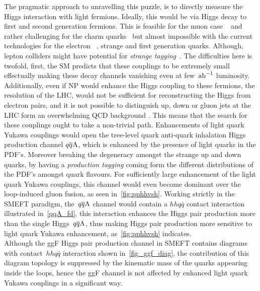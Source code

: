 The pragmatic approach to unravelling this puzzle, is to directly measure the Higgs interaction with light fermions. Ideally, this would be via Higgs decay to first and second generation fermions. This is feasible for the muon case ~\cite{ATLAS:2020fzp,CMS:2020xwi} and rather challenging for the charm quarks~\cite{ATLAS-CONF-2021-021,ATLAS:2022ers,CMS:2019hve} but almost impossible with the current technologies for the electron~ \cite{Khachatryan:2014aep}, strange and first generation quarks. Although, lepton colliders might have potential for \emph{strange tagging}~\cite{Nakai:2020kuu}. The difficulties here is twofold, first, the SM predicts that these couplings to be extremely small effectually making these decay channels vanishing even at few~$\invab$ luminosity. Additionally, even if NP would enhance the Higgs coupling to these fermions, the resolution of the LHC, would not be sufficient for reconstructing the Higgs from electron pairs, and it is not possible to distinguish up, down or gluon jets at the LHC  form an overwhelming QCD background . This means that the search for these couplings ought to take a non-trivial path. Enhancements of light quark Yukawa couplings would open the tree-level quark anti-quark inhalation Higgs production channel $q\overline q \rm A$, which is enhanced by the presence of light quarks in the PDF's. Moreover breaking the degeneracy amongst the strange up and down quarks, by having a \emph{production tagging} coming form the different distributions of the PDF's  amongst quark flavours.  For sufficiently large enhancement of the light quark Yukawa couplings, this channel would even become dominant over the loop-induced gluon fusion, as seen in~\autoref{fig:pphhvsh}. Working strictly in the  SMEFT paradigm, the~$q\overline q \rm A$ channel would contain a $hhq\bar q$ contact interaction illustrated in~\autoref{qqA_fd}, this interaction enhances the Higgs pair production more than the single Higgs~$q\overline q \rm A $, thus making Higgs pair production more sensitive to light quark Yukawa enhancement, as~\autoref{fig:pphhvsh} indicates. \\ Although the ggF Higgs pair production channel in SMEFT contains  diagrams with  contact~$hhq\bar q$  interaction shown in~\autoref{fig_ggf_diag}, the contribution of this diagram topology is suppressed by the kinematic mass of the quarks appearing inside the loops, hence the ggF channel is not affected by enhanced light quark Yukawa couplings in a significant way. \\
